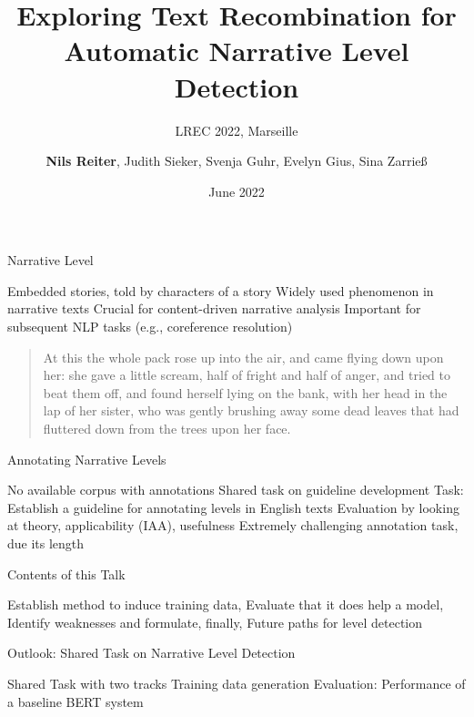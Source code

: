 \documentclass[aspectratio=169]{beamer}
\title[Narrative Level Detection]{Exploring Text Recombination for Automatic Narrative Level Detection}
\subtitle{LREC 2022, Marseille}
\author[]{\textbf{Nils Reiter}, Judith Sieker, Svenja Guhr, Evelyn Gius, Sina Zarrieß}
\date[]{June 2022}
\begin{document}
\maketitleframe

\begin{frame}{Narrative Level}
\begin{outline}
\1 Embedded stories, told by characters of a story
\1 Widely used phenomenon in narrative texts
\1 Crucial for content-driven narrative analysis
\1 Important for subsequent NLP tasks (e.g., coreference resolution)
\end{outline}
\pause
\begin{example}
\begin{quote}
At this the whole pack rose up into the air, and came flying down upon her: she gave a little scream, half of fright and half of anger, and tried to beat them off, \faExclamationTriangle{} and found herself lying on the bank, with her head in the lap of her sister, who was gently brushing away some dead leaves that had fluttered down from the trees upon her face.
\end{quote}
\end{example}
\end{frame}

\begin{frame}{Annotating Narrative Levels}
\begin{outline}
\1 No available corpus with annotations
\1 Shared task on guideline development 
\2 Task: Establish a guideline for annotating levels in English texts
\2 Evaluation by looking at theory, applicability (IAA), usefulness
\2 Extremely challenging annotation task, due its length
\end{outline}

\begin{block}{Contents of this Talk}
\begin{outline}
\1 Establish method to induce training data,
\1 Evaluate that it does help a model,
\1 Identify weaknesses and formulate, finally,
\1 Future paths for level detection
\end{outline}
\end{block}
\end{frame}

\begin{frame}{Outlook: Shared Task on Narrative Level Detection}

\renewcommand\outlineii{enumerate}
\begin{outline}
\1 Shared Task with two tracks
\2 Training data generation
\3 Evaluation: Performance of a baseline BERT system
\end{outline}
\end{frame}
\end{document}
